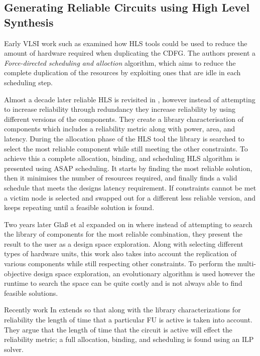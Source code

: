\subsection{Generating Reliable Circuits using High Level Synthesis}

Early VLSI work such as \cite{antola1998high} examined how HLS tools could be used to reduce the
amount of hardware required when duplicating the CDFG.
The authors present a \emph{Force-directed scheduling and alloction} algorithm, which aims to
reduce the complete duplication of the resources by exploiting ones that are idle in each
scheduling step.

Almost a decade later reliable HLS is revisited in \cite{tosun2005reliability}, however instead of
attempting to increase reliability through redundancy they increase reliability by using different versions
of the components.
They create a library characterisation of components which includes a reliability metric along with
power, area, and latency.
During the allocation phase of the HLS tool the library is searched to select the most reliable component
while still meeting the other constraints.
To achieve this a complete allocation, binding, and scheduling HLS algorithm is presented using ASAP scheduling.
It starts by finding the most reliable solution, then it minimises the number of resources required,
and finally finds a valid schedule that meets the designs latency requirement.
If constraints cannot be met a victim node is selected and swapped out for a different less reliable
version, and keeps repeating until a feasible solution is found.

Two years later Gla{\ss} et al expanded on \cite{tosun2005reliability} in \cite{glass2007interactive} where instead of
attempting to search the library of components for the most reliable combination, they present the result to the
user as a design space exploration.
Along with selecting different types of hardware units, this work also takes into account the replication of various
components while still respecting other constraints.
To perform the multi-objective design space exploration, an evolutionary algorithm is used however the runtime to
search the space can be quite costly and is not always able to find feasible solutions.

Recently work In \cite{hara2013cost} extends \cite{tosun2005reliability}
so that along with the library characterizations for reliability the length of time that a particular FU is active is taken into account.
They argue that the length of time that the circuit is active will effect the reliability metric;
a full allocation, binding, and scheduling is found using an ILP solver.

